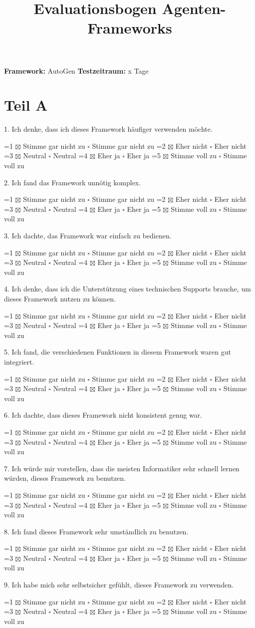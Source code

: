 \documentclass{article}
\title{Evaluationsbogen Agenten-Frameworks}
\date{}
\begin{document}
    
\maketitle
    
\vspace{-1.5cm}

\begin{center}
    \textbf{Framework:} AutoGen
    \textbf{Testzeitraum:} x Tage
\end{center}

\section*{Teil A}

\newcommand{\evalquestion}[2]{
    #1
    \begin{flushleft}
        \ifnum#2=1 $\boxtimes$ Stimme gar nicht zu \else $\square$ Stimme gar nicht zu \fi \quad
        \ifnum#2=2 $\boxtimes$ Eher nicht \else $\square$ Eher nicht \fi \quad
        \ifnum#2=3 $\boxtimes$ Neutral \else $\square$ Neutral \fi \quad
        \ifnum#2=4 $\boxtimes$ Eher ja \else $\square$ Eher ja \fi \quad
        \ifnum#2=5 $\boxtimes$ Stimme voll zu \else $\square$ Stimme voll zu \fi
    \end{flushleft}
}

\noindent
\evalquestion{1. Ich denke, dass ich dieses Framework häufiger verwenden möchte.}{0}

\noindent
\evalquestion{2. Ich fand das Framework unnötig komplex.}{0}

\noindent
\evalquestion{3. Ich dachte, das Framework war einfach zu bedienen.}{0}

\noindent
\evalquestion{4. Ich denke, dass ich die Unterstützung eines technischen Supports brauche, um dieses Framework nutzen zu können.}{0}

\noindent
\evalquestion{5. Ich fand, die verschiedenen Funktionen in diesem Framework waren gut integriert.}{0}

\noindent
\evalquestion{6. Ich dachte, dass dieses Framework nicht konsistent genug war.}{0}

\noindent
\evalquestion{7. Ich würde mir vorstellen, dass die meisten Informatiker sehr schnell lernen würden, dieses Framework zu benutzen.}{0}

\noindent
\evalquestion{8. Ich fand dieses Framework sehr umständlich zu benutzen.}{0}

\noindent
\evalquestion{9. Ich habe mich sehr selbstsicher gefühlt, dieses Framework zu verwenden.}{0}
\end{document}
